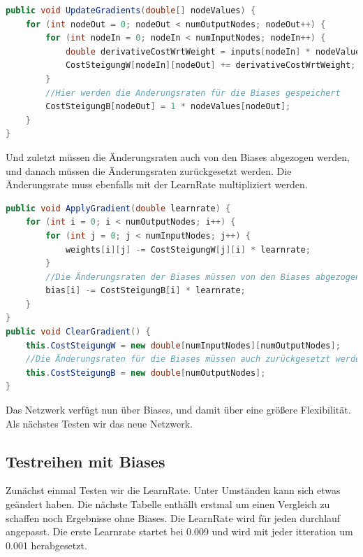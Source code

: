\documentclass[12pt]{article}
\begin{document}
\begin{lstlisting}[language=Java]
public void UpdateGradients(double[] nodeValues) {
    for (int nodeOut = 0; nodeOut < numOutputNodes; nodeOut++) {
        for (int nodeIn = 0; nodeIn < numInputNodes; nodeIn++) {
            double derivativeCostWrtWeight = inputs[nodeIn] * nodeValues[nodeOut];
            CostSteigungW[nodeIn][nodeOut] += derivativeCostWrtWeight;
        }
        //Hier werden die Anderungsraten für die Biases gespeichert
        CostSteigungB[nodeOut] = 1 * nodeValues[nodeOut];
    }
}
\end{lstlisting}Und zuletzt  müssen die Änderungsraten auch von den Biases abgezogen werden, und danach müssen die Änderungsraten zurückgesetzt werden. Die Änderungsrate muss ebenfalls mit der LearnRate multipliziert werden.\begin{lstlisting}[language=Java]
public void ApplyGradient(double learnrate) {
    for (int i = 0; i < numOutputNodes; i++) {
        for (int j = 0; j < numInputNodes; j++) {
            weights[i][j] -= CostSteigungW[j][i] * learnrate;
        }
        //Die Änderungsraten der Biases müssen von den Biases abgezogen werden
        bias[i] -= CostSteigungB[i] * learnrate;
    }
}
public void ClearGradient() {
    this.CostSteigungW = new double[numInputNodes][numOutputNodes];
    //Die Änderungsraten für die Biases müssen auch zurückgesetzt werden
    this.CostSteigungB = new double[numOutputNodes];
}
\end{lstlisting}Das Netzwerk verfügt nun über Biases, und damit über eine größere Flexibilität. Als nächstes Testen wir das neue Netzwerk.
\subsection{Testreihen mit Biases}
Zunächst einmal Testen wir die LearnRate. Unter Umständen kann sich etwas geändert haben.
Die nächste Tabelle enthällt erstmal um einen Vergleich zu schaffen noch Ergebnisse ohne Biases. Die LearnRate wird für jeden durchlauf angepasst. Die erste Learnrate startet bei 0.009 und wird mit jeder itteration um 0.001 herabgesetzt.
\end{document}
